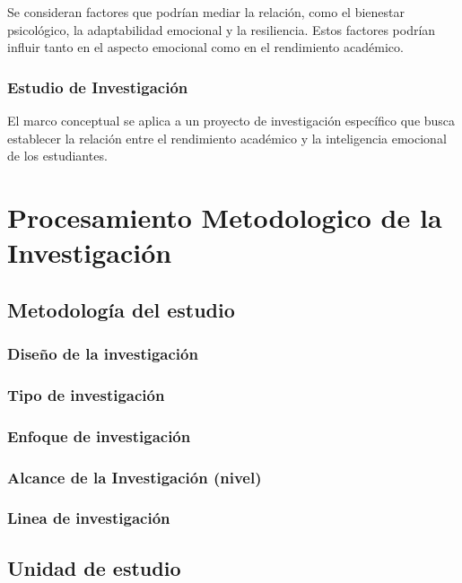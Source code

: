 \documentclass[12pt]{article}
\begin{document}
Se consideran factores que podrían mediar la relación, como el bienestar psicológico, la adaptabilidad emocional y la resiliencia.
Estos factores podrían influir tanto en el aspecto emocional como en el rendimiento académico.
\subsubsection*{Estudio de Investigación}

El marco conceptual se aplica a un proyecto de investigación específico que busca establecer la relación entre el rendimiento académico y la inteligencia emocional de los estudiantes.


\section{Procesamiento Metodologico de la Investigación}
\subsection{Metodología del estudio}
\subsubsection{  Diseño de la investigación}
\lipsum[1]
\subsubsection{  Tipo de investigación}
\lipsum[1]
\subsubsection{  Enfoque de investigación}
\lipsum[1]
\subsubsection{  Alcance de la Investigación (nivel)}
\lipsum[1]
\subsubsection{  Linea de investigación}
\lipsum[1]
\subsection{Unidad de estudio}
\end{document}
